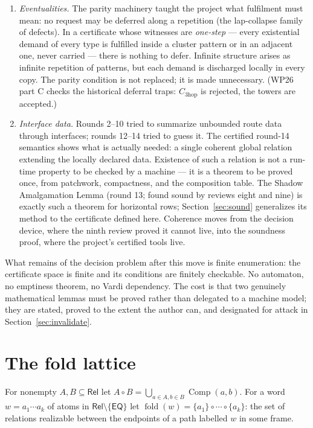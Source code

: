 \documentclass[11pt]{article}
\theoremstyle{definition}
\newcommand{\EQ}{\mathsf{EQ}}
\newcommand{\Rel}{\mathsf{Rel}}
\newcommand{\Comp}{\operatorname{Comp}}
\newcommand{\fold}{\operatorname{fold}}
\begin{document}
\begin{enumerate}[leftmargin=2em]
\item \emph{Eventualities.}  The parity machinery taught the project
what fulfilment must mean: no request may be deferred along a
repetition (the lap-collapse family of defects).  In a certificate
whose witnesses are \emph{one-step} --- every existential demand of
every type is fulfilled inside a cluster pattern or in an adjacent one,
never carried --- there is nothing to defer.  Infinite structure arises
as infinite repetition of patterns, but each demand is discharged
locally in every copy.  The parity condition is not replaced; it is
made unnecessary.  (WP26 part C checks the historical deferral traps:
$C_{\mathrm{3hop}}$ is rejected, the towers are accepted.)
\item \emph{Interface data.}  Rounds 2--10 tried to summarize
unbounded route data through interfaces; rounds 12--14 tried to guess
it.  The certified round-14 semantics shows what is actually needed: a
single coherent global relation extending the locally declared data.
Existence of such a relation is not a run-time property to be checked
by a machine --- it is a theorem to be proved once, from patchwork,
compactness, and the composition table.  The Shadow Amalgamation
Lemma (round 13; found sound by reviews eight and nine) is exactly such
a theorem for horizontal rows; Section~\ref{sec:sound} generalizes its
method to the certificate defined here.  Coherence moves from the
decision device, where the ninth review proved it cannot live, into the
soundness proof, where the project's certified tools live.
\end{enumerate}

What remains of the decision problem after this move is finite
enumeration: the certificate space is finite and its conditions are
finitely checkable.  No automaton, no emptiness theorem, no Vardi
dependency.  The cost is that two genuinely mathematical lemmas must be
proved rather than delegated to a machine model; they are stated,
proved to the extent the author can, and designated for attack in
Section~\ref{sec:invalidate}.

\section{The fold lattice}\label{sec:fold}

For nonempty $A,B\subseteq\Rel$ let
$A\circ B=\bigcup_{a\in A,b\in B}\Comp(a,b)$.  For a word
$w=a_1\cdots a_k$ of atoms in $\Rel\setminus\{\EQ\}$ let
$\fold(w)=\{a_1\}\circ\cdots\circ\{a_k\}$: the set of relations
realizable between the endpoints of a path labelled $w$ in some frame.
\end{document}
